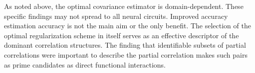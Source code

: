 As noted above, the optimal covariance estimator is domain-dependent. These specific findings may not spread to all neural circuits.
Improved accuracy estimation accuracy is not the main aim or the only benefit.  
The selection of the optimal regularization scheme in itself serves as an effective descriptor of the dominant correlation structures. The finding that identifiable subsets of partial correlations were important to describe the partial correlation makes such pairs as prime candidates as direct functional interactions.
